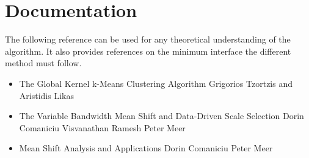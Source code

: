 \section{Documentation}
The following reference can be used for any theoretical understanding of the algorithm. It also provides references on the minimum interface the different method must follow.

\begin{itemize}
\item The Global Kernel k-Means Clustering Algorithm
Grigorios Tzortzis and Aristidis Likas
\item The Variable Bandwidth Mean Shift and Data-Driven Scale Selection
Dorin Comaniciu
Visvanathan Ramesh 
Peter Meer
\item Mean Shift Analysis and Applications
Dorin Comaniciu
Peter Meer

\end{itemize}
